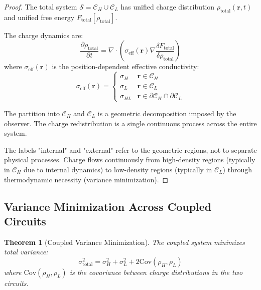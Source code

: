 \documentclass[12pt,a4paper]{article}
\theoremstyle{plain}
\newtheorem{theorem}{Theorem}[section]
\theoremstyle{definition}
\theoremstyle{remark}
\begin{document}
\begin{proof}
The total system $\mathcal{S} = \mathcal{C}_H \cup \mathcal{C}_L$ has unified charge distribution $\rho_{\text{total}}(\mathbf{r}, t)$ and unified free energy $F_{\text{total}}[\rho_{\text{total}}]$.

The charge dynamics are:
\begin{equation}
\frac{\partial \rho_{\text{total}}}{\partial t} = \nabla \cdot \left( \sigma_{\text{eff}}(\mathbf{r}) \nabla \frac{\delta F_{\text{total}}}{\delta \rho_{\text{total}}} \right)
\end{equation}
where $\sigma_{\text{eff}}(\mathbf{r})$ is the position-dependent effective conductivity:
\begin{equation}
\sigma_{\text{eff}}(\mathbf{r}) = \begin{cases}
\sigma_H & \mathbf{r} \in \mathcal{C}_H \\
\sigma_L & \mathbf{r} \in \mathcal{C}_L \\
\sigma_{HL} & \mathbf{r} \in \partial \mathcal{C}_H \cap \partial \mathcal{C}_L
\end{cases}
\end{equation}

The partition into $\mathcal{C}_H$ and $\mathcal{C}_L$ is a geometric decomposition imposed by the observer. The charge redistribution is a single continuous process across the entire system.

The labels "internal" and "external" refer to the geometric regions, not to separate physical processes. Charge flows continuously from high-density regions (typically in $\mathcal{C}_H$ due to internal dynamics) to low-density regions (typically in $\mathcal{C}_L$) through thermodynamic necessity (variance minimization).
\end{proof}

\subsection{Variance Minimization Across Coupled Circuits}

\begin{theorem}[Coupled Variance Minimization]
\label{thm:coupled_variance}
The coupled system minimizes total variance:
\begin{equation}
\sigma^2_{\text{total}} = \sigma^2_H + \sigma^2_L + 2 \text{Cov}(\rho_H, \rho_L)
\end{equation}
where $\text{Cov}(\rho_H, \rho_L)$ is the covariance between charge distributions in the two circuits.
\end{theorem}
\end{document}
